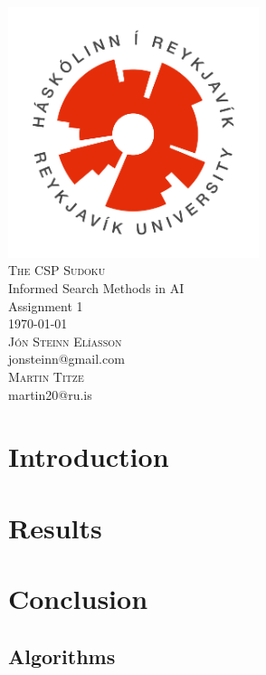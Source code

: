 \documentclass[11pt]{article}
\theoremstyle{definition}
\begin{document}
\begin{titlepage}
    \begin{center}
    	\text{ } \\[0.5cm]
        \includegraphics[width=0.55\textwidth]{hr_logo.png}\\[2cm]
        \textsc{\Huge The CSP Sudoku}\\[1cm]
        {\LARGE Informed Search Methods in AI}\\[1cm]
        {\Large Assignment 1}\\[1cm]
        \textsc{\Large \today}\\[2.5cm]
        \textsc{\Huge Jón Steinn Elíasson}\\[0.25cm]
        {\large jonsteinn@gmail.com}\\[0.75cm]
        \textsc{\Huge Martin Titze}\\[0.25cm]
        {\large martin20@ru.is}
    \end{center}
    \vfill
\end{titlepage}
\text{}
\setcounter{page}{2}
\newpage
\tableofcontents
\listoffigures
\listoftables
\listofalgorithms
\newpage
\text{}
\newpage
\cleardoublepage
{}

\setlength{\headheight}{15pt}
\renewcommand{\headrulewidth}{0pt}
\pagestyle{fancy}
\fancyhf{}
\fancyfoot[C]{\thepage}
\fancyhead[L]{\leftmark}
\fancyhead[R]{\rightmark}

\section{Introduction}


\section{Results}


\section{Conclusion}


\newpage

\begin{appendices}
\section{Algorithms}\label{app:algs}

\end{appendices}



\newpage
\fancyhf{}
\fancyfoot[C]{\thepage}


\end{document}
